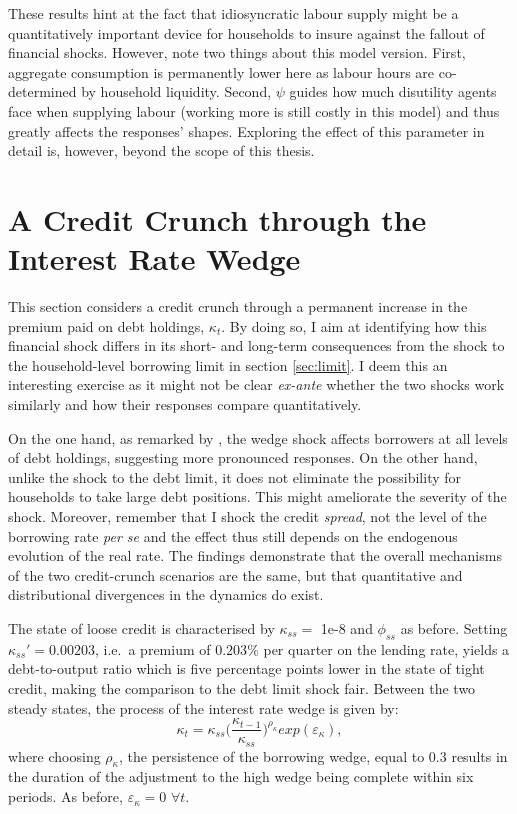 \documentclass[a4paper,12pt]{article} %
\numberwithin{equation}{section} %
\numberwithin{figure}{section}
\numberwithin{table}{section}
\begin{document}
These results hint at the fact that idiosyncratic labour supply might be a quantitatively important device for households to insure against the fallout of financial shocks. However, note two things about this model version. First, aggregate consumption is permanently lower here as labour hours are co-determined by household liquidity. Second, $\psi$ guides how much disutility agents face when supplying labour (working more is still costly in this model) and thus greatly affects the responses' shapes. Exploring the effect of this parameter in detail is, however, beyond the scope of this thesis.

\section{A Credit Crunch through the Interest Rate Wedge}
\label{sec:wedge}

This section considers a credit crunch through a permanent increase in the premium paid on debt holdings, $\kappa_t$. By doing so, I aim at identifying how this financial shock differs in its short- and long-term consequences from the shock to the household-level borrowing limit in section \ref{sec:limit}. I deem this an interesting exercise as it might not be clear \textit{ex-ante} whether the two shocks work similarly and how their responses compare quantitatively. 

On the one hand, as remarked by \textcite{gl2017}, the wedge shock affects borrowers at all levels of debt holdings, suggesting more pronounced responses. On the other hand, unlike the shock to the debt limit, it does not eliminate the possibility for households to take large debt positions. This might ameliorate the severity of the shock. Moreover, remember that I shock the credit \textit{spread}, not the level of the borrowing rate \textit{per se} and the effect thus still depends on the endogenous evolution of the real rate. The findings demonstrate that the overall mechanisms of the two credit-crunch scenarios are the same, but that quantitative and distributional divergences in the dynamics do exist. 

The state of loose credit is characterised by $\kappa_{ss} =$ 1e-8 and $\phi_{ss}$ as before. Setting $\kappa_{ss}' = 0.00203$, i.e.~a premium of $0.203\%$ per quarter on the lending rate, yields a debt-to-output ratio which is five percentage points lower in the state of tight credit, making the comparison to the debt limit shock fair. Between the two steady states, the process of the interest rate wedge is given by:
\begin{equation}
    \kappa_t = \kappa_{ss} \Bigg( \frac{\kappa_{t-1}}{\kappa_{ss}} \Bigg)^{\rho_{\kappa}} exp(\varepsilon_{\kappa}), \label{eq:wedge-process}
\end{equation}
where choosing $\rho_{\kappa}$, the persistence of the borrowing wedge, equal to $0.3$ results in the duration of the adjustment to the high wedge being complete within six periods. As before, $\varepsilon_{\kappa} = 0$ $\forall t$.
\end{document}
